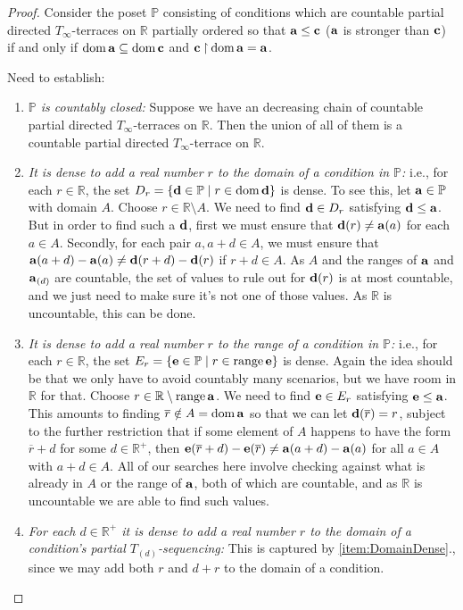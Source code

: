 \documentclass{amsart}
\theoremstyle{definition}
\theoremstyle{remark}
\renewcommand{\P}{\mathbb{P}}
\newcommand{\R}{\mathbb{R}}
\renewcommand{\c}{\mathfrak{c}}
\DeclareMathOperator{\ran}{range}
\DeclareMathOperator{\dom}{dom}
\newcommand{\st}{\; | \;}
\newcommand{\set}[2]{\left\{#1\st #2 \right\}}
\newcommand{\rest}{\mathbin{\upharpoonright}}
\renewcommand{\a}{\textup{\textbf{a}}}
\renewcommand{\c}{\textup{\textbf{c}}}
\renewcommand{\d}{\textup{\textbf{d}}}
\newcommand{\e}{\textup{\textbf{e}}}
\renewcommand{\r}{\overline r}
\begin{document}
\begin{proof}
Consider the poset $\P$ consisting of conditions which are countable partial directed $T_\infty$-terraces on $\R$ partially ordered so that $\a \leq \c$ ($\a$ is stronger than $\c$) if and only if $\dom \a \subseteq \dom \c$ and $\c \rest \dom \a = \a$.

Need to establish: \begin{enumerate}
	\item \emph{$\P$ is countably closed:} Suppose we have an decreasing chain of countable partial directed $T_\infty$-terraces on $\R$. Then the union of all of them is a countable partial directed $T_\infty$-terrace on $\R$.
	\item \label{item:DomainDense} \emph{It is dense to add a real number $r$ to the domain of a condition in $\P$:} i.e., for each $r \in \R$, the set $D_r=\set{\d \in \P}{r \in \dom \d }$ is dense. To see this, let $\a \in \P$ with domain $A$. Choose $r \in \R \setminus A$. We need to find $\d \in D_r$ satisfying $\d \leq \a$. But in order to find such a $\d$, first we must ensure that $\d(r) \neq \a(a)$ for each $a \in A$. Secondly, for each pair $a, a+d \in A$, we must ensure that $\a(a+d)-\a(a) \neq \d(r+d)-\d(r)$ if $r+d \in A$. As $A$ and the ranges of $\a$ and $\a_{(d)}$ are countable, the set of values to rule out for $\d(r)$ is at most countable, and we just need to make sure it's not one of those values. As $\R$ is uncountable, this can be done.
	\item \emph{It is dense to add a real number $r$ to the range of a condition in $\P$:} i.e., for each $r \in \R$, the set $E_r=\set{\e \in \P}{r \in \ran \e }$ is dense. Again the idea should be that we only have to avoid countably many scenarios, but we have room in $\R$ for that. Choose $r \in \R \setminus \ran \a$. We need to find $\e \in E_r$ satisfying $\e \leq \a$. This amounts to finding $\r \notin A = \dom \a$ so that we can let $\d(\overline r)=r$, subject to the further restriction that if some element of $A$ happens to have the form $\r +d$ for some $d \in \R^+$, then $\e(\r+d)-\e(\r) \neq \a(a+d)-\a(a)$ for all $a\in A$ with $a+d \in A$. All of our searches here involve checking against what is already in $A$ or the range of $\a$, both of which are countable, and as $\R$ is uncountable we are able to find such values.
	\item \label{item:StepFunctionDomainDense} \emph{For each $d \in \R^+$ it is dense to add a real number $r$ to the domain of a condition's partial $T_{(d)}$-sequencing:} This is captured by \ref{item:DomainDense}., since we may add both $r$ and $d+r$ to the domain of a condition.

\end{enumerate}
\end{proof}
\end{document}
